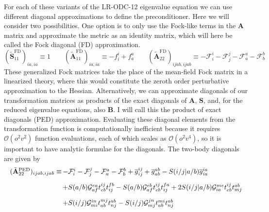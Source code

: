For each of these variants of the LR-ODC-12 eigenvalue equation we can use
different diagonal approximations to define the preconditioner.
Here we will consider two possibilities.
One option is to only use the Fock-like terms in the \(\mathbf{A}\) matrix and
approximate the metric as an identity matrix, which will here be called the Fock
diagonal (FD) approximation.
\begin{equation}
    \label{eq:davidson:fock-diagonal}
    (\tilde{\mathbf{S}}_{11}^\mathrm{FD})_{ia,ia}
    \equiv
    1
    \qquad
    (\tilde{\mathbf{A}}_{11}^\mathrm{FD})_{ia,ia}
    \equiv
    -
    f_i^i
    +
    f_a^a
    \qquad
    (\tilde{\mathbf{A}}_{22}^\mathrm{FD})_{ijab,ijab}
    \equiv
    -
    \mathcal{F}_i^i
    -
    \mathcal{F}_j^j
    -
    \mathcal{F}_a^a
    -
    \mathcal{F}_b^b
\end{equation}
These generalized Fock matrices take the place of the mean-field Fock matrix in
a linearized theory, where this would constitute the zeroth order perturbative
approximation to the Hessian.
Alternatively, we can approximate diagonals of our transformation matrices as
products of the exact diagonals of \(\mathbf{A}\), \(\mathbf{S}\), and, for the
reduced eigenvalue equations, also \(\mathbf{B}\).
I will call this the product of exact diagonals (PED) approximation.
Evaluating these diagonal elements from the transformation function is
computationally inefficient because it requires \(\mathcal{O}(o^2v^2)\) function
evaluations, each of which scales as \(\mathcal{O}(o^2v^4)\), so it is important
to have analytic formulae for the diagonals.
The two-body diagonals are given by
\begin{equation}
    \begin{array}{r@{\,}l}
        (\tilde{\mathbf{A}}_{22}^\mathrm{PED})_{ijab,ijab}
        \equiv
        &
        -
        \mathcal{F}_i^i
        -
        \mathcal{F}_j^j
        -
        \mathcal{F}_a^a
        -
        \mathcal{F}_b^b
        +
        \overline{g}_{ij}^{ij}
        +
        \overline{g}_{ab}^{ab}
        -
        S(i/j|a/b)
        \overline{g}_{ia}^{ia}
        \\[10pt]
        &
        +
        S(a/b)
        \mathcal{G}_{af}^{ea}
        t_{eb}^{ij}
        t_{ij}^{fb}
        -
        S(a/b)
        \mathcal{G}_{af}^{eb}
        t_{eb}^{ij}
        t_{ij}^{fa}
        +
        2
        S(i/j|a/b)
        \mathcal{G}_{ia}^{me}
        t_{eb}^{ij}
        t_{mj}^{ab}
        \\[10pt]
        &
        +
        S(i/j)
        \mathcal{G}_{mi}^{in}
        t_{ab}^{mj}
        t_{nj}^{ab}
        -
        S(i/j)
        \mathcal{G}_{mj}^{jn}
        t_{ab}^{mi}
        t_{nj}^{ab}
    \end{array}
\end{equation}
